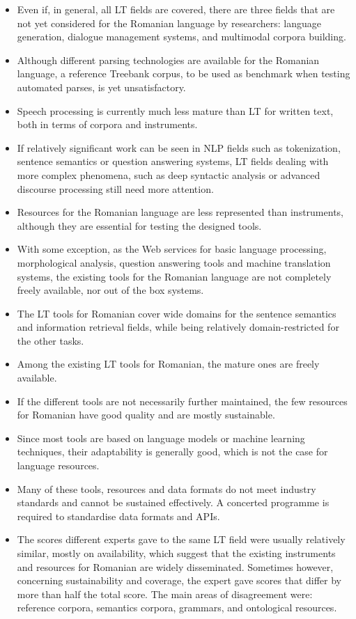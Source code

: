 \documentclass[]{../../metanetpaper}
\begin{document}
\begin{multicols}{2}
\begin{itemize}
\item Even if, in general, all LT fields are covered, there are three fields that are not yet considered for the Romanian language by researchers: language generation, dialogue management systems, and multimodal corpora building.
\item Although different parsing technologies are available for the Romanian language, a reference Treebank corpus, to be used as benchmark when testing automated parses, is yet unsatisfactory.
\item Speech processing is currently much less mature than LT for written text, both in terms of corpora and instruments.
\item If relatively significant work can be seen in NLP fields such as tokenization, sentence semantics or question answering systems, LT fields dealing with more complex phenomena, such as deep syntactic analysis or advanced discourse processing still need more attention.
\item Resources for the Romanian language are less represented than instruments, although they are essential for testing the designed tools.
\item With some exception, as the Web services for basic language processing, morphological analysis, question answering tools and machine translation systems, the existing tools for the Romanian language are not completely freely available, nor out of the box systems. 
\item The LT tools for Romanian cover wide domains for the sentence semantics and information retrieval fields, while being relatively domain-restricted for the other tasks.
\item Among the existing LT tools for Romanian, the mature ones are freely available.
\item If the different tools are not necessarily further maintained, the few resources for Romanian have good quality and are mostly sustainable.
\item Since most tools are based on language models or machine learning techniques, their adaptability is generally good, which is not the case for language resources.
\item Many of these tools, resources and data formats do not meet industry standards and cannot be sustained effectively. A concerted programme is required to standardise data formats and APIs.
\item The scores different experts gave to the same LT field were usually relatively similar, mostly on availability, which suggest that the existing instruments and resources for Romanian are widely disseminated. Sometimes however, concerning sustainability and coverage, the expert gave scores that differ by more than half the total score. The main areas of disagreement were: reference corpora, semantics corpora, grammars, and ontological resources. 

\end{itemize}
\end{multicols}
\end{document}
